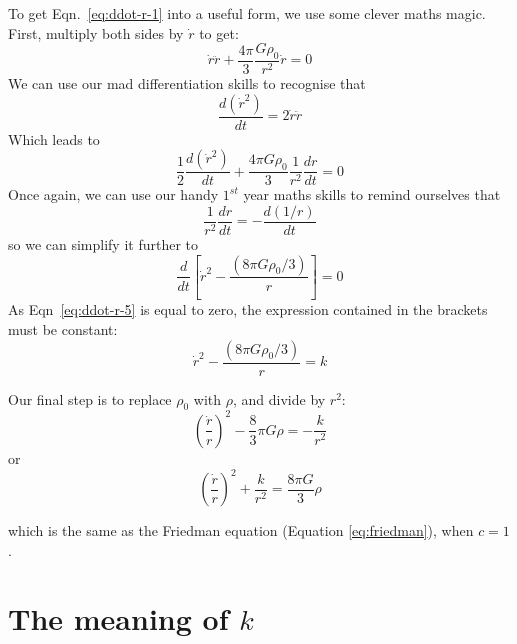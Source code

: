 \documentclass[11pt,a4paper]{book}
\begin{document}
To get Eqn.~\eqref{eq:ddot-r-1} into a useful form, we use some clever maths
magic. First, multiply both sides by \(\dot{r}\) to get:
\begin{equation}
\dot{r}\ddot{r} + \dfrac{4\pi}{3}\dfrac{G\rho_{0}}{r^2}\dot{r} = 0
\label{eq:ddot-r-2}
\end{equation}
We can use our mad differentiation skills to recognise that
\begin{equation}
\dfrac{d(\dot{r}^2)}{dt} = 2\dot{r}\ddot{r}
\label{eq:ddot-r-3}
\end{equation}
Which leads to
\begin{equation}
\dfrac{1}{2}\dfrac{d(\dot{r}^2)}{dt} + \dfrac{4\pi G \rho_0}{3} \dfrac{1}{r^2}\dfrac{dr}{dt} = 0
\label{eq:ddot-r-4}
\end{equation}
Once again, we can use our handy \(1^{st}\) year maths skills to remind
ourselves that
\begin{equation}
\dfrac{1}{r^2}\dfrac{dr}{dt} = -\dfrac{d(1/r)}{dt}
\label{eq:ddot-r-4}
\end{equation}
so we can simplify it further to
\begin{equation}
\dfrac{d}{dt}\left[\dot{r}^2 - \dfrac{(8\pi G \rho_0 / 3)}{r}\right] = 0
\label{eq:ddot-r-5}
\end{equation}
As Eqn~\eqref{eq:ddot-r-5} is equal to zero, the expression contained in the
brackets must be constant:
\begin{equation}
\dot{r}^2 - \dfrac{(8\pi G \rho_0 / 3)}{r} = k
\label{eq:ddot-r-6}
\end{equation}

Our final step is to replace \(\rho_0\) with \(\rho\), and divide by \(r^2\):
\begin{equation}
\left(\dfrac{\dot{r}}{r}\right)^2 - \dfrac{8}{3}\pi G \rho = -\dfrac{k}{r^2}
\label{eq:ddot-r-7}
\end{equation}
or
\begin{equation}
\left(\dfrac{\dot{r}}{r}\right)^2 + \dfrac{k}{r^2} = \dfrac{8\pi G}{3}\rho
\label{eq:ddot-r-8}
\end{equation}

which is the same as the Friedman equation
(Equation \eqref{eq:friedman}), when \(c=1\).

\hypertarget{sec:curvature}{%
\section{\texorpdfstring{The meaning of \(k\)}{The meaning of k}}\label{sec:curvature}}
\end{document}
